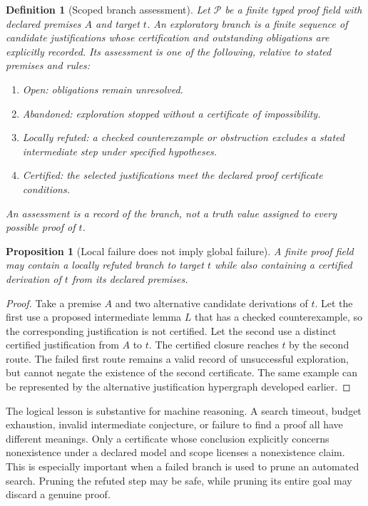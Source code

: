 \documentclass[11pt,oneside]{article}
\theoremstyle{komorebiplain}
\newtheorem{proposition}[theorem]{Proposition}
\theoremstyle{komorebidefinition}
\newtheorem{definition}[theorem]{Definition}
\theoremstyle{komorebiremark}
\newcommand{\Pcal}{\mathcal P}
\begin{document}
\begin{definition}[Scoped branch assessment]
\label{res:22:1}
Let $\Pcal$ be a finite typed proof field with declared premises $A$ and target $t$. An exploratory branch is a finite sequence of candidate justifications whose certification and outstanding obligations are explicitly recorded. Its assessment is one of the following, relative to stated premises and rules:
\begin{enumerate}[label=\textup{(\roman*)}]
\item \emph{Open}: obligations remain unresolved.
\item \emph{Abandoned}: exploration stopped without a certificate of impossibility.
\item \emph{Locally refuted}: a checked counterexample or obstruction excludes a stated intermediate step under specified hypotheses.
\item \emph{Certified}: the selected justifications meet the declared proof certificate conditions.
\end{enumerate}
An assessment is a record of the branch, not a truth value assigned to every possible proof of $t$.
\end{definition}

\begin{proposition}[Local failure does not imply global failure]
\label{res:22:2}
A finite proof field may contain a locally refuted branch to target $t$ while also containing a certified derivation of $t$ from its declared premises.
\end{proposition}
\begin{proof}
Take a premise $A$ and two alternative candidate derivations of $t$. Let the first use a proposed intermediate lemma $L$ that has a checked counterexample, so the corresponding justification is not certified. Let the second use a distinct certified justification from $A$ to $t$. The certified closure reaches $t$ by the second route. The failed first route remains a valid record of unsuccessful exploration, but cannot negate the existence of the second certificate. The same example can be represented by the alternative justification hypergraph developed earlier.
\end{proof}



The logical lesson is substantive for machine reasoning. A search timeout, budget exhaustion, invalid intermediate conjecture, or failure to find a proof all have different meanings. Only a certificate whose conclusion explicitly concerns nonexistence under a declared model and scope licenses a nonexistence claim. This is especially important when a failed branch is used to prune an automated search. Pruning the refuted step may be safe, while pruning its entire goal may discard a genuine proof.
\end{document}
